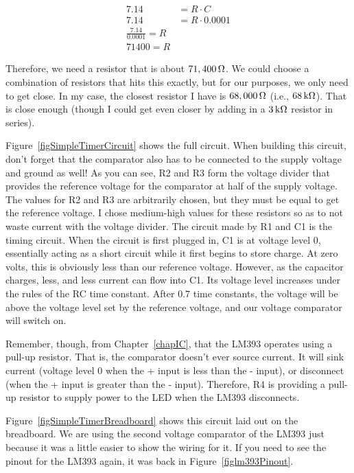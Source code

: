 \begin{align*}
7.14 &= R\cdot C \\
7.14 &= R\cdot 0.0001 \\
\frac{7.14}{0.0001} = R \\
71400 = R
\end{align*}

Therefore, we need a resistor that is about $71,400\,\si{\ohm}$.
We could choose a combination of resistors that hits this exactly, but for our purposes, we only need to get close.
In my case, the closest resistor I have is $68,000\,\si{\ohm}$ (i.e., $68\,\si{\kilo\ohm}$).
That is close enough (though I could get even closer by adding in a $3\,\si{\kilo\ohm}$ resistor in series).


Figure~\ref{figSimpleTimerCircuit} shows the full circuit.
When building this circuit, don't forget that the comparator also has to be connected to the supply voltage and ground as well!
As you can see, R2 and R3 form the voltage divider that provides the reference voltage for the comparator at half of the supply voltage.
The values for R2 and R3 are arbitrarily chosen, but they must be equal to get the reference voltage.
I chose medium-high values for these resistors so as to not waste current with the voltage divider.
The circuit made by R1 and C1 is the timing circuit.
When the circuit is first plugged in, C1 is at voltage level 0, essentially acting as a short circuit while it first begins to store charge.
At zero volts, this is obviously less than our reference voltage.
However, as the capacitor charges, less, and less current can flow into C1.
Its voltage level increases under the rules of the RC time constant.
After 0.7 time constants, the voltage will be above the voltage level set by the reference voltage, and our voltage comparator will switch on.

Remember, though, from Chapter~\ref{chapIC}, that the LM393 operates using a pull-up resistor.
That is, the comparator doesn't ever source current.  
It will sink current (voltage level 0 when the + input is less than the - input), or disconnect (when the + input is greater than the - input).
Therefore, R4 is providing a pull-up resistor to supply power to the LED when the LM393 disconnects.


Figure~\ref{figSimpleTimerBreadboard} shows this circuit laid out on the breadboard.
We are using the second voltage comparator of the LM393 just because it was a little easier to show the wiring for it.
If you need to see the pinout for the LM393 again, it was back in Figure~\ref{figlm393Pinout}.

